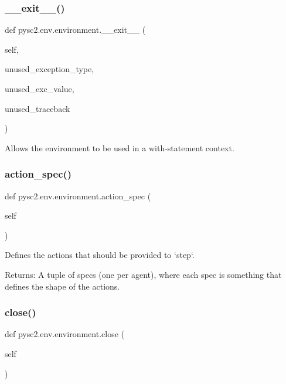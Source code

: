 \subsubsection{\texorpdfstring{\+\_\+\+\_\+exit\+\_\+\+\_\+()}{\_\_exit\_\_()}}
{\footnotesize\ttfamily def pysc2.\+env.\+environment.\+\_\+\+\_\+exit\+\_\+\+\_\+ (\begin{DoxyParamCaption}\item[{}]{self,  }\item[{}]{unused\+\_\+exception\+\_\+type,  }\item[{}]{unused\+\_\+exc\+\_\+value,  }\item[{}]{unused\+\_\+traceback }\end{DoxyParamCaption})}

\begin{DoxyVerb}Allows the environment to be used in a with-statement context.\end{DoxyVerb}
 \mbox{\label{namespacepysc2_1_1env_1_1environment_a74074388916b1ee75fe907ba1ef89cd9}} 
\subsubsection{\texorpdfstring{action\+\_\+spec()}{action\_spec()}}
{\footnotesize\ttfamily def pysc2.\+env.\+environment.\+action\+\_\+spec (\begin{DoxyParamCaption}\item[{}]{self }\end{DoxyParamCaption})}

\begin{DoxyVerb}Defines the actions that should be provided to `step`.

Returns:
  A tuple of specs (one per agent), where each spec is something that
    defines the shape of the actions.
\end{DoxyVerb}
 \mbox{\label{namespacepysc2_1_1env_1_1environment_a12f1f831e94b51902434a752e0b2785f}} 
\subsubsection{\texorpdfstring{close()}{close()}}
{\footnotesize\ttfamily def pysc2.\+env.\+environment.\+close (\begin{DoxyParamCaption}\item[{}]{self }\end{DoxyParamCaption})}

